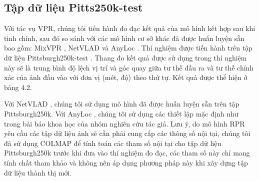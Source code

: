 \subsection*{Tập dữ liệu Pitts250k-test}
Với tác vụ VPR, chúng tôi tiến hành đo đạc kết quả của mô hình kết hợp sau khi tinh chỉnh, sau đó so sánh với các mô hình cơ sở khác đã được huấn luyện sẵn bao gồm: MixVPR \cite{alibey2023mixvpr}, NetVLAD \cite{arandjelovic2016netvlad} và AnyLoc \cite{keetha2023anyloc}. Thí nghiệm được tiến hành trên tập dữ liệu Pittsburgh250k-test \cite{6618963}. Thang đo kết quả được sử dụng trong thí nghiệm này sẽ là trung bình độ lệch vị trí và góc quay giữa tư thế đầu ra và tư thế chính xác của ảnh đầu vào với đơn vị (mét, độ) theo thứ tự. Kết quả được thể hiện ở bảng 4.2.

Với NetVLAD \cite{arandjelovic2016netvlad}, chúng tôi sử dụng mô hình đã được huấn luyện sẵn trên tập Pittsburgh250k. Với AnyLoc \cite{keetha2023anyloc},  chúng tôi sử dụng các thiết lập mặc định như trong bài báo khoa học của nhóm nghiên cứu tác giả. Lưu ý, do mô hình RPR yêu cầu các tập dữ liệu ảnh sẽ cần phải cung cấp các thông số nội tại, chúng tôi đã sử dụng COLMAP để tính toán các tham số nội tại cho tập dữ liệu Pittsburgh250k trước khi đưa vào thí nghiệm đo đạc, các tham số này chỉ mang tính chất tham khảo và không nên áp dụng phương pháp này khi xây dựng tập dữ liệu thành thị mới.

